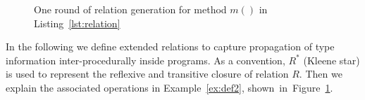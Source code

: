 \documentclass{fac}
\begin{document}
\begin{figure}
\caption{One round of relation generation for method $m()$ in Listing~\ref{lst:relation}}
\label{fig:relations}
\end{figure}


In the following we define extended relations to capture propagation of type information inter-procedurally inside programs. As a convention, $R^*$ (Kleene star) is used to represent the reflexive and transitive closure of relation $R$. Then we explain the associated operations in Example~\ref{ex:def2}, shown~in~Figure~\ref{fig:relations}.
\end{document}
